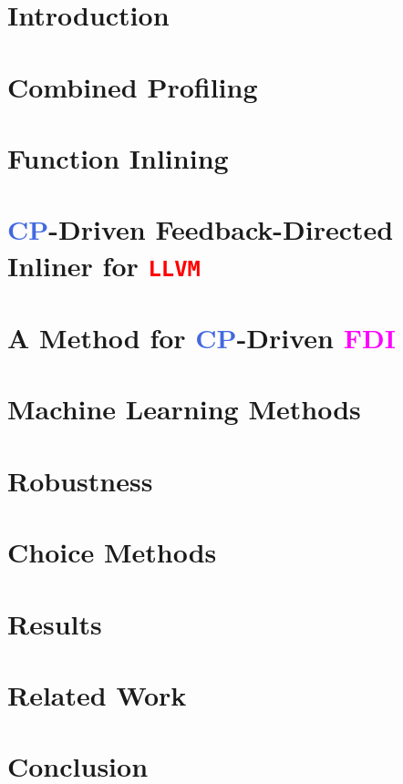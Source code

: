 \documentclass[conference]{IEEEtran}
\renewcommand{\ifColorText}[2]{\textcolor{#1}{#2}}  %
\def\llvm{{\ifColorText{Red}{{\tt LLVM}}}}
\def\CP{{\ifColorText{RoyalBlue}{CP}}}
\def\FDI{{\ifColorText{Magenta}{FDI}}}
\begin{document}
\section{Introduction}
	\label{sec:intro}
	

\section{Combined Profiling}
	\label{sec:cmbprof}
	

\section{Function Inlining}
	\label{sec:inlining}
	

\section{\CP-Driven Feedback-Directed Inliner for \llvm}
	\label{sec:fdi}
	

\section{A Method for \CP-Driven \FDI}
	\label{sec:method}
	

\section{Machine Learning Methods}
	\label{sec:ml}
	

\section{Robustness}
	\label{sec:robust}
	

\section{Choice Methods}
	\label{sec:choice}
	

\section{Results}
	\label{sec:results}
	

\section{Related Work}
	\label{sec:related}
	

\section{Conclusion}
	\label{sec:conclusion}
	

%	

%


\end{document}
